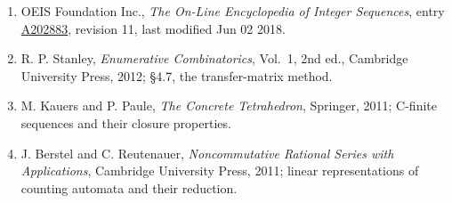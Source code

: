 \documentclass[11pt]{article}
\theoremstyle{definition}
\begin{document}
\begin{enumerate}

\item OEIS Foundation Inc., \emph{The On-Line Encyclopedia of Integer Sequences}, entry \href{https://oeis.org/A202883}{A202883}, revision 11, last modified Jun 02 2018.

\item R. P. Stanley, \emph{Enumerative Combinatorics}, Vol.~1, 2nd ed., Cambridge University Press, 2012; \S4.7, the transfer-matrix method.

\item M. Kauers and P. Paule, \emph{The Concrete Tetrahedron}, Springer, 2011; C-finite sequences and their closure properties.

\item J. Berstel and C. Reutenauer, \emph{Noncommutative Rational Series with Applications}, Cambridge University Press, 2011; linear representations of counting automata and their reduction.

\end{enumerate}
\end{document}
